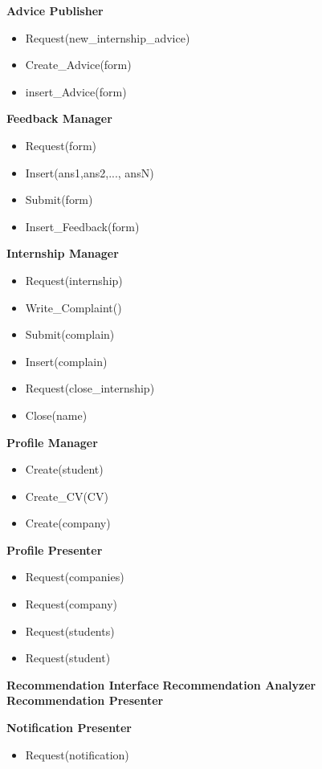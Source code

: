 	\textbf{Advice Publisher}
	\begin{itemize}
		\item Request(new\_internship\_advice)
		\item Create\_Advice(form)
		\item insert\_Advice(form)
		
	\end{itemize}
	
	\textbf{Feedback Manager}
	\begin{itemize}
		\item Request(form)
		\item Insert(ans1,ans2,..., ansN)
		\item Submit(form)
		\item Insert\_Feedback(form)
	\end{itemize}
	
	\textbf{Internship Manager}
	\begin{itemize}
		\item Request(internship)
		\item Write\_Complaint()
		\item Submit(complain)
		\item Insert(complain)
		\item Request(close\_internship)
		\item Close(name)
	\end{itemize}
	
	\textbf{Profile Manager}
	\begin{itemize}
		\item Create(student)
		\item Create\_CV(CV)
		\item Create(company)
	\end{itemize}
	
	\textbf{Profile Presenter}
	\begin{itemize}
		\item Request(companies)
		\item Request(company)
		\item Request(students)
		\item Request(student)
	\end{itemize}
	
	\textbf{Recommendation Interface}
	\textbf{Recommendation Analyzer}
	\textbf{Recommendation Presenter}
	
	\textbf{Notification Presenter}
	\begin{itemize}
		\item Request(notification)
	\end{itemize}
	
